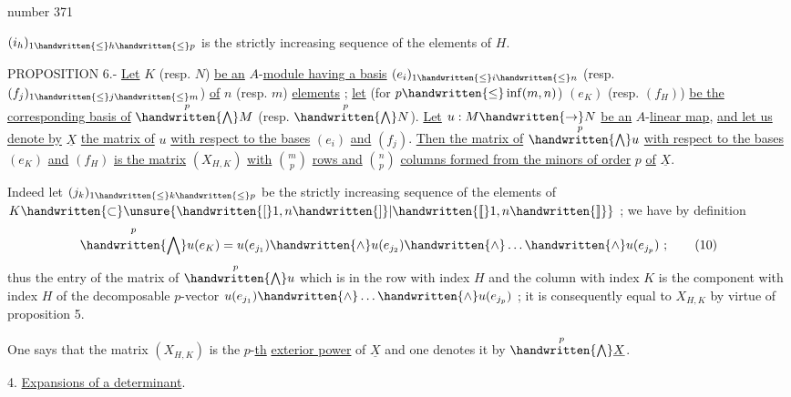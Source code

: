 \begin{flushright}number 371\end{flushright}

$(i_h)_{1\handwritten{\leq}h\handwritten{\leq}p}$ is the strictly increasing sequence of the elements of $H$.

PROPOSITION 6.- \uline{Let} $K$ (resp. $N$) \uline{be an} $A$-\uline{module having a basis} $(e_i)_{1\handwritten{\leq}i\handwritten{\leq}n}$ (resp. $(f_j)_{1\handwritten{\leq}j\handwritten{\leq}m}$) \uline{of} $n$ (resp. $m$) \uline{elements} ; \uline{let} (for $p\handwritten{\leq}\inf(m,n)$) $(e_K)$ (resp. $(f_H)$) \uline{be the corresponding basis of} $\overset{p}{\handwritten{\bigwedge}}M$ (resp. $\overset{p}{\handwritten{\bigwedge}}N$). \uline{Let} $u:M\handwritten{\to}N$ \uline{be an} $A$-\uline{linear map}, \uline{and let us denote by} $\underline{X}$ \uline{the matrix of} $u$ \uline{with respect to the bases} $(e_i)$ \uline{and} $(f_j)$. \uline{Then the matrix of} $\overset{p}{\handwritten{\bigwedge}}u$ \uline{with respect to the bases} $(e_K)$ \uline{and} $(f_H)$ \uline{is the matrix} $(X_{H,K})$ \uline{with} $\binom{m}{p}$ \uline{rows and} $\binom{n}{p}$ \uline{columns formed from the minors of order} $p$ \uline{of} $\underline{X}$.

Indeed let $(j_k)_{1\handwritten{\leq}k\handwritten{\leq}p}$ be the strictly increasing sequence of the elements of $K\handwritten{\subset}\unsure{\handwritten{[}1,n\handwritten{]}|\handwritten{[\![}1,n\handwritten{]\!]}}$ ; we have by definition
\[
\overset{p}{\handwritten{\bigwedge}}u(e_K)=u(e_{j_1})\handwritten{\wedge}u(e_{j_2})\handwritten{\wedge}\ldots\handwritten{\wedge}u(e_{j_p})\ ;
\tag*{(10)}
\]
thus the entry of the matrix of $\overset{p}{\handwritten{\bigwedge}}u$ which is in the row with index $H$ and the column with index $K$ is the component with index $H$ of the decomposable $p$-vector $u(e_{j_1})\handwritten{\wedge}\ldots\handwritten{\wedge}u(e_{j_p})$ ; it is consequently equal to $X_{H,K}$ by virtue of proposition 5.

One says that the matrix $(X_{H,K})$ is the $p$-\uline{th} \uline{exterior power} of $\underline{X}$ and one denotes it by $\overset{p}{\handwritten{\bigwedge}}\underline{X}$.

4. \uline{Expansions of a determinant}.

